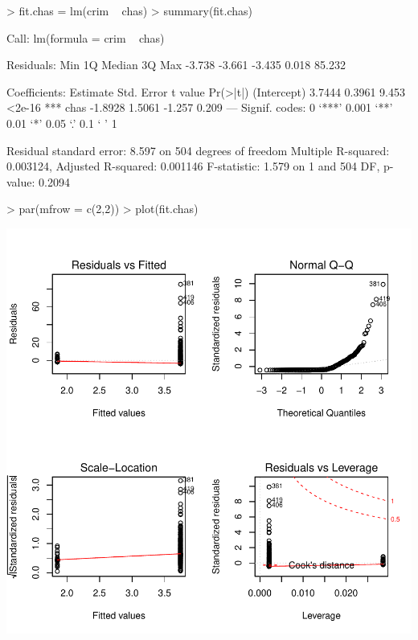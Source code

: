 \documentclass[a4paper]{article}
\begin{document}
\begin{Schunk}
\begin{Sinput}
> fit.chas = lm(crim ~ chas)
> summary(fit.chas)
\end{Sinput}
\begin{Soutput}
Call:
lm(formula = crim ~ chas)

Residuals:
   Min     1Q Median     3Q    Max 
-3.738 -3.661 -3.435  0.018 85.232 

Coefficients:
            Estimate Std. Error t value Pr(>|t|)    
(Intercept)   3.7444     0.3961   9.453   <2e-16 ***
chas         -1.8928     1.5061  -1.257    0.209    
---
Signif. codes:  0 ‘***’ 0.001 ‘**’ 0.01 ‘*’ 0.05 ‘.’ 0.1 ‘ ’ 1

Residual standard error: 8.597 on 504 degrees of freedom
Multiple R-squared:  0.003124,	Adjusted R-squared:  0.001146 
F-statistic: 1.579 on 1 and 504 DF,  p-value: 0.2094
\end{Soutput}
\begin{Sinput}
> par(mfrow = c(2,2))
> plot(fit.chas)
\end{Sinput}
\end{Schunk}
\includegraphics{mutivariblelm-chas}
\end{document}
